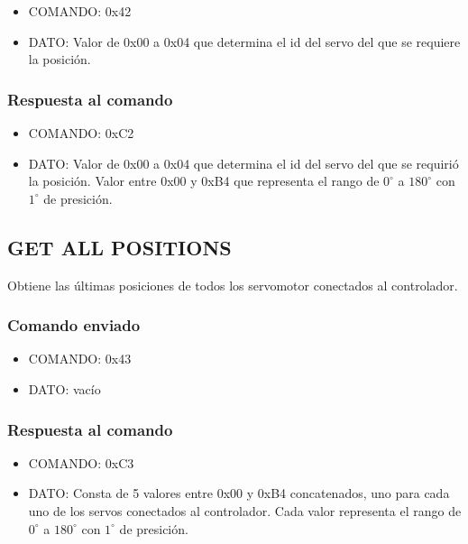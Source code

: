 \documentclass[a4paper,10pt]{article}
\begin{document}
\begin{itemize}
	\item{COMANDO:} 0x42
	\item{DATO:} Valor de 0x00 a 0x04 que determina el id del servo del que se requiere la posici\'on.
\end{itemize}

\subsubsection*{Respuesta al comando}

\begin{itemize}
	\item{COMANDO:} 0xC2
	\item{DATO:} Valor de 0x00 a 0x04 que determina el id del servo del que se requiri\'o la posici\'on.
	Valor entre 0x00 y 0xB4 que representa el rango de $0^{\circ}$ a $180^{\circ}$ con $1^{\circ}$ de presici\'on.
\end{itemize}

\subsection{GET ALL POSITIONS}
\label{get_all_positions}

Obtiene las \'ultimas posiciones de todos los servomotor conectados al controlador.

\subsubsection*{Comando enviado}

\begin{itemize}
	\item{COMANDO:} 0x43
	\item{DATO:} vac\'io
\end{itemize}

\subsubsection*{Respuesta al comando}

\begin{itemize}
	\item{COMANDO:} 0xC3
	\item{DATO:} Consta de 5 valores entre 0x00 y 0xB4 concatenados, uno para cada uno de los servos conectados al controlador.
	Cada valor representa el rango de $0^{\circ}$ a $180^{\circ}$ con $1^{\circ}$ de presici\'on.
\end{itemize}
\end{document}
